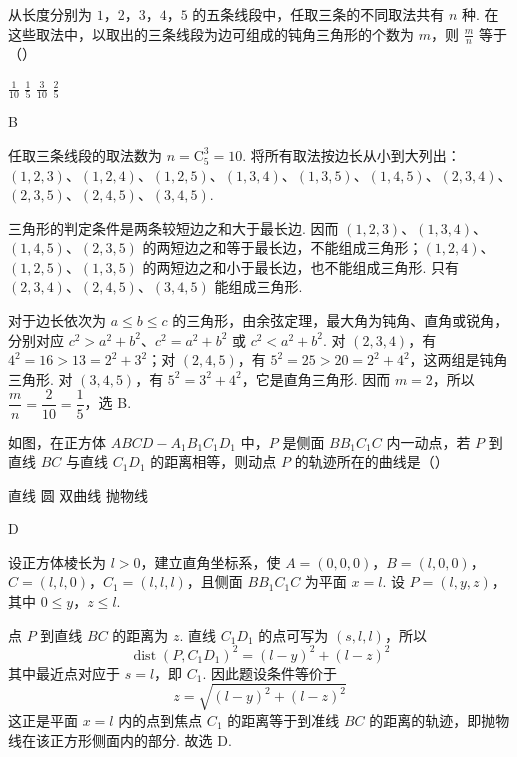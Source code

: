 \begin{problem}
从长度分别为 \(1\)，\(2\)，\(3\)，\(4\)，\(5\) 的五条线段中，任取三条的不同取法共有 \(n\) 种. 在这些取法中，以取出的三条线段为边可组成的钝角三角形的个数为 \(m\)，则 \(\frac{m}{n}\) 等于（\quad）

\choices
    {\(\frac{1}{10}\)}
    {\(\frac{1}{5}\)}
    {\(\frac{3}{10}\)}
    {\(\frac{2}{5}\)}
\begin{answer}
B
\end{answer}

\begin{solution}
任取三条线段的取法数为
\(n=\mathrm C_{5}^{3}=10\). 将所有取法按边长从小到大列出：\((1,2,3)\)、\((1,2,4)\)、\((1,2,5)\)、\((1,3,4)\)、\((1,3,5)\)、\((1,4,5)\)、\((2,3,4)\)、\((2,3,5)\)、\((2,4,5)\)、\((3,4,5)\).

三角形的判定条件是两条较短边之和大于最长边. 因而 \((1,2,3)\)、\((1,3,4)\)、\((1,4,5)\)、\((2,3,5)\) 的两短边之和等于最长边，不能组成三角形；\((1,2,4)\)、\((1,2,5)\)、\((1,3,5)\) 的两短边之和小于最长边，也不能组成三角形. 只有 \((2,3,4)\)、\((2,4,5)\)、\((3,4,5)\) 能组成三角形.

对于边长依次为 \(a\leqslant b\leqslant c\) 的三角形，由余弦定理，最大角为钝角、直角或锐角，分别对应 \(c^{2}>a^{2}+b^{2}\)、\(c^{2}=a^{2}+b^{2}\) 或 \(c^{2}<a^{2}+b^{2}\). 对 \((2,3,4)\)，有 \(4^{2}=16>13=2^{2}+3^{2}\)；对 \((2,4,5)\)，有 \(5^{2}=25>20=2^{2}+4^{2}\)，这两组是钝角三角形. 对 \((3,4,5)\)，有 \(5^{2}=3^{2}+4^{2}\)，它是直角三角形. 因而 \(m=2\)，所以
\(\dfrac{m}{n}=\dfrac{2}{10}=\dfrac15\)，选 B.
\end{solution}

\end{problem}

\begin{problem}
如图，在正方体 \(ABCD-A_{1}B_{1}C_{1}D_{1}\) 中，\(P\) 是侧面 \(BB_{1}C_{1}C\) 内一动点，若 \(P\) 到直线 \(BC\) 与直线 \(C_{1}D_{1}\) 的距离相等，则动点 \(P\) 的轨迹所在的曲线是（\quad）


\choices
    {直线}
    {圆}
    {双曲线}
    {抛物线}
\begin{answer}
D
\end{answer}

\begin{solution}
设正方体棱长为 \(l>0\)，建立直角坐标系，使
\(A=(0,0,0)\)，\(B=(l,0,0)\)，\(C=(l,l,0)\)，\(C_{1}=(l,l,l)\)，且侧面 \(BB_{1}C_{1}C\) 为平面 \(x=l\). 设 \(P=(l,y,z)\)，其中 \(0\leqslant y\)，\(z\leqslant l\).

点 \(P\) 到直线 \(BC\) 的距离为 \(z\). 直线 \(C_{1}D_{1}\) 的点可写为 \((s,l,l)\)，所以
\[
\operatorname{dist}(P,C_{1}D_{1})^{2}=(l-y)^{2}+(l-z)^{2}
\]
其中最近点对应于 \(s=l\)，即 \(C_{1}\). 因此题设条件等价于
\[
z=\sqrt{(l-y)^{2}+(l-z)^{2}}
\]
这正是平面 \(x=l\) 内的点到焦点 \(C_{1}\) 的距离等于到准线 \(BC\) 的距离的轨迹，即抛物线在该正方形侧面内的部分. 故选 D.
\end{solution}

\end{problem}

